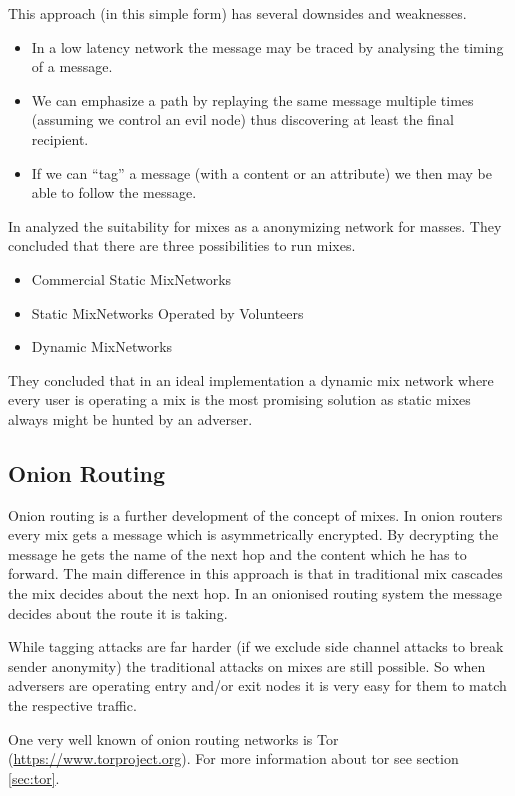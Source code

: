 This approach (in this simple form) has several downsides and weaknesses.

\begin{itemize}
	\item In a low latency network the message may be traced by analysing the timing of a message.
	\item We can emphasize a path by replaying the same message multiple times (assuming we control an evil node) thus discovering at least the final recipient.
	\item If we can ``tag'' a message (with a content or an attribute) we then may be able to follow the message.
\end{itemize}

In \citeyear{RP03-1} \citeauthor{RP03-1} analyzed the suitability for mixes as a anonymizing network for masses. They concluded that there are three possibilities to run mixes.
\begin{itemize}
	\item Commercial Static MixNetworks
	\item Static MixNetworks Operated by Volunteers
	\item Dynamic MixNetworks
\end{itemize}
They concluded that in an ideal implementation a dynamic mix network where every user is operating a mix is the most promising solution as static mixes always might be hunted by an adverser.

\subsection{Onion Routing}
Onion routing is a further development of the concept of mixes. In onion routers every mix gets a message which is asymmetrically encrypted. By decrypting the message he gets the name of the next hop and the content which he has to forward. The main difference in this approach is that in traditional mix cascades the mix decides about the next hop. In an onionised routing system the message decides about the route it is taking. 

While tagging attacks are far harder (if we exclude side channel attacks to break sender anonymity) the traditional attacks on mixes are still possible. So when adversers are operating entry and/or exit nodes it is very easy for them to match the respective traffic.

One very well known of onion routing networks is Tor (\href{https://www.torproject.org}{https://www.torproject.org}). For more information about tor see section \ref{sec:tor}.

